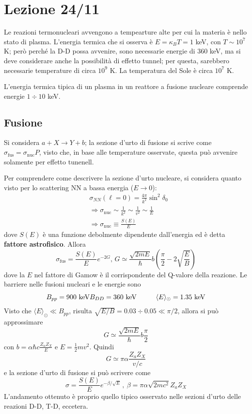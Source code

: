 \documentclass[11pt, a4paper]{scrartcl}
\theoremstyle{style}
\numberwithin{equation}{subsection}
\begin{document}
\newpage

\section{Lezione 24/11}

Le reazioni termonucleari avvengono a tempearture alte per cui la materia \`e nello stato di plasma.
L'energia termica che si osserva \`e $E = \kappa _B T = 1$ keV, con $T \sim 10^7$ K; per\`o perch\'e la D-D possa avvenire, sono necessarie energie di $360$ keV, ma si deve considerare anche la possibilit\`a di effetto tunnel; per questa, sarebbero necessarie temperature di circa $10^9$ K.
La temperatura del Sole \`e circa $10^7$ K.

L'energia termica tipica di un plasma in un reattore a fusione nucleare comprende energie $1\div 10$ keV.

\subsection{Fusione}

Si considera $a +X \to  Y + b$; la sezione d'urto di fusione si scrive come $\sigma _\text{fus} = \sigma _\text{nuc} P$, visto che, in base alle temperature osservate, questa pu\`o avvenire solamente per effetto tunenell.

Per comprendere come descrivere la sezione d'urto nucleare, si considera quanto visto per lo scattering NN a bassa energia ($E\to 0$):
\[
	\begin{split}
		&\sigma _{N N} (\ell =0) = \frac{4\pi}{k^2} \sin^2 \delta _0\\
		& \Rightarrow \sigma _{\text{nuc}}\sim \frac{1}{k^2} \sim \frac{1}{v^2} \sim \frac{1}{E}\\
		&\Rightarrow \sigma _\text{nuc} \equiv \frac{S(E)}{E}
	\end{split}
\] 
dove $S(E)$ \`e una funzione debolmente dipendente dall'energia ed \`e detta \textbf{fattore astrofisico}.
Allora
\begin{equation}
	\sigma _\text{fus} = \frac{S(E)}{E} e^{-2G}, \, G \simeq  \frac{\sqrt{2mE} }{\hbar } b \left(\frac{\pi}{2} - 2\sqrt{\frac{E}{B}} \right)
\end{equation}
dove la $E$ nel fattore di Gamow \`e il corrispondente del Q-valore della reazione.
Le barriere nelle fusioni nucleari e le energie sono 
\[
B_{p p} = 900~\text{keV} \\ B_{D D} = 360~\text{keV} \hspace{1cm} \langle E \rangle _\odot = 1.35~\text{keV}
\] 
Visto che $\langle E \rangle_\odot  \ll B_{p p}$, risulta $\sqrt{E / B}  =0.03\div 0.05 \ll \pi / 2$, allora si pu\`o approssimare
\[
	G \simeq \frac{\sqrt{2mE}}{\hbar } b \frac{\pi }{2}
\] 
con $b = \alpha \hbar c \frac{Z_\alpha Z_X}{E}$ e $E = \frac{1}{2} mv^2$.
Quindi
\[
G \simeq \pi \alpha  \frac{Z_a Z_X}{v / c}
\] 
e la sezione d'urto di fusione si pu\`o scrivere come
\[
	\sigma = \frac{S(E)}{E} e^{- \beta /\sqrt{E} } \, , \ \beta  = \pi \alpha  \sqrt{2 m c^2 } Z_a Z_X
\] 
L'andamento ottenuto \`e proprio quello tipico osservato nelle sezioni d'urto delle reazioni D-D, T-D, eccetera.
\end{document}
